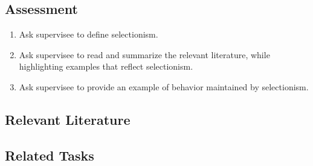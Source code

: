 \subsection{Assessment}
\begin{enumerate}
\item Ask supervisee to define selectionism.
\item Ask supervisee to read and summarize the relevant literature, while highlighting examples that reflect selectionism.
\item Ask supervisee to provide an example of behavior maintained by selectionism.
%
\end{enumerate}
%
\subsection{Relevant Literature}
\begin{refsection}
\nocite{cooper2007applied,
        pennypacker1992behavior,
        skinner1981selection}
\printbibliography[heading=none]
\end{refsection}
%
\subsection{Related Tasks}
\fourFKFifteen{}\\
\fourFKThirtyOne{}\\
\fourFKThirtyThree{}\\
\fourFKFourtyOne{}\\
\fourFKFourtyTwo{}\\
